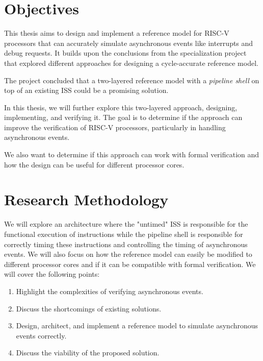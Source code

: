 \section{Objectives}




This thesis aims to design and implement a reference model for RISC-V processors that can accurately simulate asynchronous events like interrupts and debug requests. It builds upon the conclusions from the specialization project \cite{torjenygaardeikenesDesigningRISCVReference2023} that explored different approaches for designing a cycle-accurate reference model. 

The project concluded that a two-layered reference model with a \textit{pipeline shell} on top of an existing ISS could be a promising solution. 

In this thesis, we will further explore this two-layered approach, designing, implementing, and verifying it. The goal is to determine if the approach can improve the verification of RISC-V processors, particularly in handling asynchronous events. 

We also want to determine if this approach can work with formal verification and how the design can be useful for different processor cores.


\section{Research Methodology}

We will explore an architecture where the "untimed" ISS is responsible for the functional execution of instructions while the pipeline shell is responsible for correctly timing these instructions and controlling the timing of asynchronous events. We will also focus on how the reference model can easily be modified to different processor cores and if it can be compatible with formal verification.  
We will cover the following points:

\begin{enumerate}
    \item Highlight the complexities of verifying asynchronous events. 
    \item Discuss the shortcomings of existing solutions.
    \item Design, architect, and implement a reference model to simulate asynchronous events correctly.
    \item Discuss the viability of the proposed solution.
\end{enumerate}

